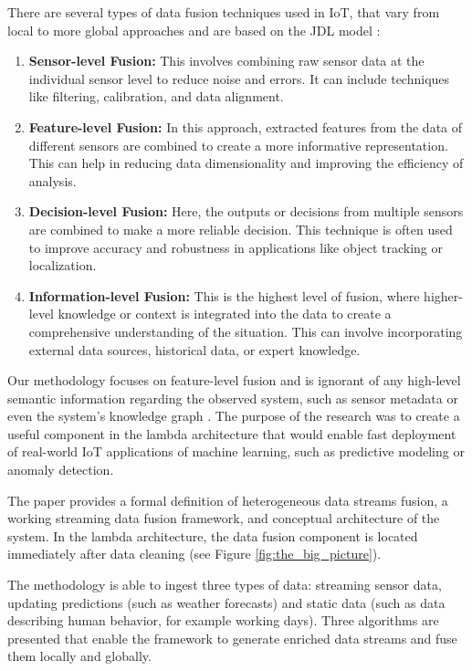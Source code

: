 There are several types of data fusion techniques used in IoT, that vary from local to more global approaches and are based on the JDL model \cite{hall:2001:multisensor}:
\begin{enumerate}
    \item \textbf{Sensor-level Fusion:} This involves combining raw sensor data at the individual sensor level to reduce noise and errors. It can include techniques like filtering, calibration, and data alignment.
    
    \item \textbf{Feature-level Fusion:} In this approach, extracted features from the data of different sensors are combined to create a more informative representation. This can help in reducing data dimensionality and improving the efficiency of analysis.
    
    \item \textbf{Decision-level Fusion:} Here, the outputs or decisions from multiple sensors are combined to make a more reliable decision. This technique is often used to improve accuracy and robustness in applications like object tracking or localization.
    
    \item \textbf{Information-level Fusion:} This is the highest level of fusion, where higher-level knowledge or context is integrated into the data to create a comprehensive understanding of the situation. This can involve incorporating external data sources, historical data, or expert knowledge.
\end{enumerate}

Our methodology focuses on feature-level fusion and is ignorant of any high-level semantic information regarding the observed system, such as sensor metadata or even the system's knowledge graph \cite{kenda:2019:fusion}. 
The purpose of the research was to create a useful component in the lambda architecture that would enable fast deployment of real-world IoT applications of machine learning, such as predictive modeling or anomaly detection.

The paper provides a formal definition of heterogeneous data streams fusion, a working streaming data fusion framework, and conceptual architecture of the system.
In the lambda architecture, the data fusion component is located immediately after data cleaning (see Figure \ref{fig:the_big_picture}).

The methodology is able to ingest three types of data: streaming sensor data, updating predictions (such as weather forecasts) and static data (such as data describing human behavior, for example working days).
Three algorithms are presented that enable the framework to generate enriched data streams and fuse them locally and globally.


